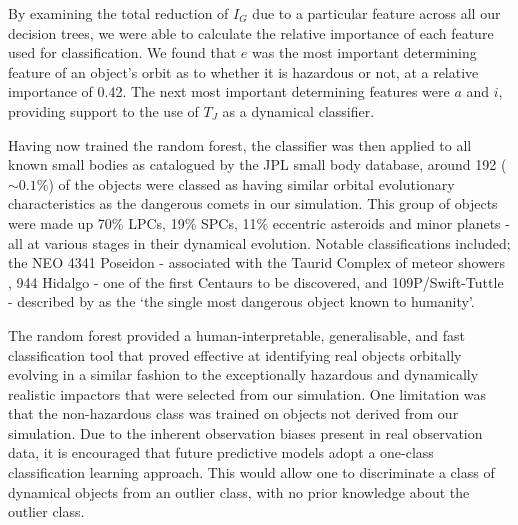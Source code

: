 By examining the total reduction of $I_G$ due to a particular feature across all our decision trees, we were able to calculate the relative importance of each feature used for classification. We found that $e$ was the most important determining feature of an object's orbit as to whether it is hazardous or not, at a relative importance of 0.42. The next most important determining features were $a$ and $i$, providing support to the use of $T_J$ as a dynamical classifier.

Having now trained the random forest, the classifier was then applied to all known small bodies as catalogued by the JPL small body database, around 192 ($\sim0.1\%$) of the objects were classed as having similar orbital evolutionary characteristics as the dangerous comets in our simulation. This group of objects were made up 70\% LPCs, 19\% SPCs, 11\% eccentric asteroids and minor planets - all at various stages in their dynamical evolution. Notable classifications included; the NEO 4341 Poseidon - associated with the Taurid Complex of meteor showers \citep{2001A&A...373..329B}, 944 Hidalgo - one of the first Centaurs to be discovered, and 109P/Swift-Tuttle - described by \cite{verschuur1997impact} as the `the single most dangerous object known to humanity'.

The random forest provided a human-interpretable, generalisable, and fast classification tool that proved effective at identifying real objects orbitally evolving in a similar fashion to the exceptionally hazardous and dynamically realistic impactors that were selected from our simulation. One limitation was that the non-hazardous class was trained on objects not derived from our simulation. Due to the inherent observation biases present in real observation data, it is encouraged that future predictive models adopt a one-class classification learning approach. This would allow one to discriminate a class of dynamical objects from an outlier class, with no prior knowledge about the outlier class.



